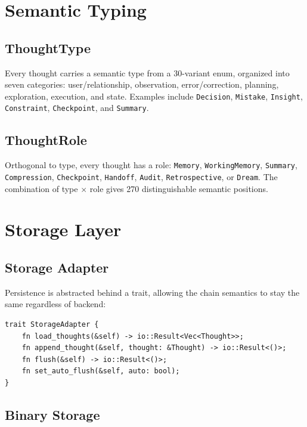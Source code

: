 \documentclass[11pt,a4paper]{article}
\begin{document}
\section{Semantic Typing}

\subsection{ThoughtType}

Every thought carries a semantic type from a 30-variant enum, organized into seven
categories: user/relationship, observation, error/correction, planning, exploration,
execution, and state. Examples include \texttt{Decision}, \texttt{Mistake},
\texttt{Insight}, \texttt{Constraint}, \texttt{Checkpoint}, and \texttt{Summary}.

\subsection{ThoughtRole}

Orthogonal to type, every thought has a role: \texttt{Memory}, \texttt{WorkingMemory},
\texttt{Summary}, \texttt{Compression}, \texttt{Checkpoint}, \texttt{Handoff},
\texttt{Audit}, \texttt{Retrospective}, or \texttt{Dream}. The combination of type
$\times$ role gives 270 distinguishable semantic positions.

\section{Storage Layer}

\subsection{Storage Adapter}

Persistence is abstracted behind a trait, allowing the chain semantics to stay the same
regardless of backend:

\begin{lstlisting}
trait StorageAdapter {
    fn load_thoughts(&self) -> io::Result<Vec<Thought>>;
    fn append_thought(&self, thought: &Thought) -> io::Result<()>;
    fn flush(&self) -> io::Result<()>;
    fn set_auto_flush(&self, auto: bool);
}
\end{lstlisting}

\subsection{Binary Storage}
\end{document}
